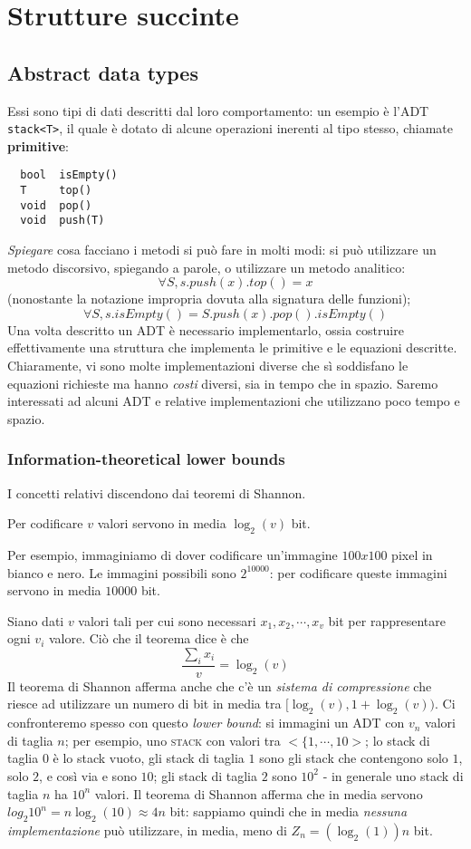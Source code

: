 \chapter{Strutture succinte}
\section{Abstract data types}
Essi sono tipi di dati descritti dal loro comportamento: un esempio è
l'ADT \texttt{stack<T>}, il quale è dotato di alcune operazioni inerenti al tipo
stesso, chiamate \textbf{primitive}:
\begin{lstlisting}
  bool  isEmpty()
  T     top()
  void  pop()
  void  push(T)
\end{lstlisting}
\textit{Spiegare} cosa facciano i metodi si può fare in molti modi: si può
utilizzare un metodo discorsivo, spiegando a parole, o utilizzare un metodo
analitico:
$$
	\forall S, s.push(x).top() = x
$$
(nonostante la notazione impropria dovuta alla signatura delle funzioni);
$$
	\forall S, s.isEmpty() = S.push(x).pop().isEmpty()
$$
Una volta descritto un ADT è necessario implementarlo, ossia costruire effettivamente
una struttura che implementa le primitive e le equazioni descritte. Chiaramente,
vi sono molte implementazioni diverse che sì soddisfano le equazioni richieste
ma hanno \textit{costi} diversi, sia in tempo che in spazio. Saremo interessati
ad alcuni ADT e relative implementazioni che utilizzano poco tempo e spazio.

\subsection{Information-theoretical lower bounds}
I concetti relativi discendono dai teoremi di Shannon.
\begin{theorem}
	Per codificare $v$ valori servono in media $\log_2(v)$ bit.
\end{theorem}

Per esempio, immaginiamo di dover codificare un'immagine $100x100$ pixel
in bianco e nero. Le immagini possibili sono $2^{10000}$: per codificare
queste immagini servono in media $10000$ bit.

Siano dati $v$ valori tali per cui sono necessari $x_1, x_2, \cdots, x_v$ bit
per rappresentare ogni $v_i$ valore. Ciò che il teorema dice è che
$$
	\frac{\sum_{i} x_i}{v} = \log_2(v)
$$
Il teorema di Shannon afferma anche che c'è un \textit{sistema di compressione}
che riesce ad utilizzare un numero di bit in media tra $[\log_2(v), 1+ \log_2(v))$.
Ci confronteremo spesso con questo \textit{lower bound}: si immagini un ADT
con $v_n$ valori di taglia $n$; per esempio, uno \textsc{stack}  con valori tra
$<\{1, \cdots, 10>$; lo stack di taglia $0$ è lo stack vuoto, gli stack
di taglia $1$ sono gli stack che contengono solo $1$, solo $2$, e così via e
sono $10$; gli stack di taglia $2$ sono $10^2$ - in generale uno stack
di taglia $n$ ha $10^n$ valori. Il teorema di  Shannon afferma che in media servono
$log_2{10^n} = n \log_2(10) \approx 4n$ bit: sappiamo quindi che in media
\textit{nessuna implementazione} può utilizzare, in media, meno di
$Z_n = (\log_2(1))n$ bit.


